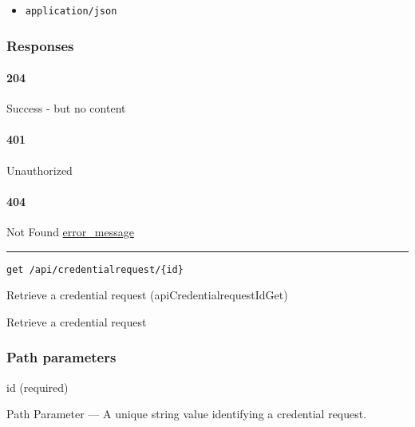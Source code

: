 \begin{itemize}
\tightlist
\item
  \texttt{application/json}
\end{itemize}

\hypertarget{responses-121}{%
\subsubsection{Responses}\label{responses-121}}

\hypertarget{section-395}{%
\paragraph{204}\label{section-395}}

Success - but no content \protect\hyperlink{}{}

\hypertarget{section-396}{%
\paragraph{401}\label{section-396}}

Unauthorized \protect\hyperlink{}{}

\hypertarget{section-397}{%
\paragraph{404}\label{section-397}}

Not Found \protect\hyperlink{error_message}{error\_message}

\begin{center}\rule{0.5\linewidth}{\linethickness}\end{center}

\protect\hypertarget{apiCredentialrequestIdGet}{}{}

\begin{verbatim}
get /api/credentialrequest/{id}
\end{verbatim}

Retrieve a credential request ({apiCredentialrequestIdGet})

Retrieve a credential request

\hypertarget{path-parameters-64}{%
\subsubsection{Path parameters}\label{path-parameters-64}}

id (required)

{Path Parameter} --- A unique string value identifying a credential
request.

